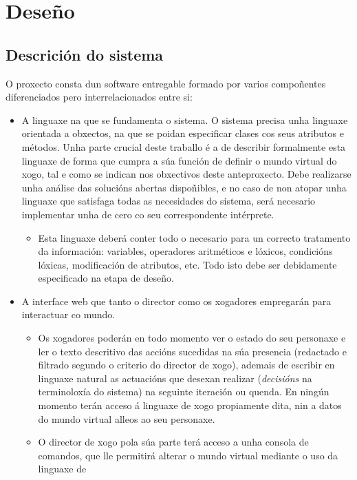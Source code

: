 \chapter{Deseño}


\section{Descrición do sistema}
O proxecto consta dun software entregable formado por varios compoñentes
diferenciados pero interrelacionados entre si:
\begin{itemize}
  \item A linguaxe na que se fundamenta o sistema. O sistema precisa unha
  linguaxe orientada a obxectos, na que se poidan especificar clases cos seus
  atributos e métodos. Unha parte crucial deste traballo é a de describir
  formalmente esta linguaxe de forma que cumpra a súa función de definir o
  mundo virtual do xogo, tal e como se indican nos obxectivos deste
  anteproxecto. Debe realizarse unha análise das solucións abertas dispoñibles,
  e no caso de non atopar unha linguaxe que satisfaga todas as necesidades do
  sistema, será necesario implementar unha de cero co seu correspondente
  intérprete.
  \begin{itemize}
    \item Esta linguaxe deberá conter todo o necesario para un correcto
    tratamento da información:
    variables, operadores aritméticos e lóxicos, condicións lóxicas,
    modificación de atributos, etc.
    Todo isto debe ser debidamente especificado na etapa de deseño.
  \end{itemize}
  \item A interface web que tanto o director como os xogadores empregarán para
  interactuar co mundo.
  \begin{itemize}
    \item Os xogadores poderán en todo momento ver o estado do seu personaxe e
    ler o texto descritivo das accións sucedidas na súa presencia (redactado e
    filtrado segundo o criterio do director de xogo), ademais de escribir en
    linguaxe natural as actuacións que desexan realizar ({\it decisións} na
    terminoloxía do sistema) na seguinte iteración ou quenda. En ningún momento
    terán acceso á linguaxe de xogo propiamente dita, nin a datos do mundo
    virtual alleos ao seu personaxe.
    \item O director de xogo pola súa parte terá acceso a unha consola de comandos,
    que lle permitirá alterar o mundo virtual mediante o uso da linguaxe de

\end{itemize}
\end{itemize}
